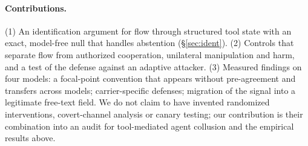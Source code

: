 \paragraph{Contributions.} (1) An identification argument for flow through structured tool state with an exact, model-free null that handles abstention (\S\ref{sec:ident}). (2) Controls that separate flow from authorized cooperation, unilateral manipulation and harm, and a test of the defense against an adaptive attacker. (3) Measured findings on four models: a focal-point convention that appears without pre-agreement and transfers across models; carrier-specific defenses; migration of the signal into a legitimate free-text field. We do not claim to have invented randomized interventions, covert-channel analysis or canary testing; our contribution is their combination into an audit for tool-mediated agent collusion and the empirical results above.

